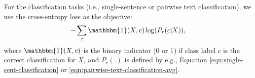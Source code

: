 

For the classification tasks (i.e., single-sentence or pairwise text classification), we use the cross-entropy loss as the objective:
\begin{equation}
-\sum_c \mathbbm{1}(X,c) \log(P_r(c|X)),
\label{eqn:cross-entropy-loss}
\end{equation}
where $\mathbbm{1}(X,c)$ is the binary indicator (0 or 1) if class label $c$ is the correct classification for $X$, and $P_r(.)$ is defined by e.g., Equation \ref{eqn:single-sent-classification} or \ref{eqn:pairwise-text-classification-avg}.

